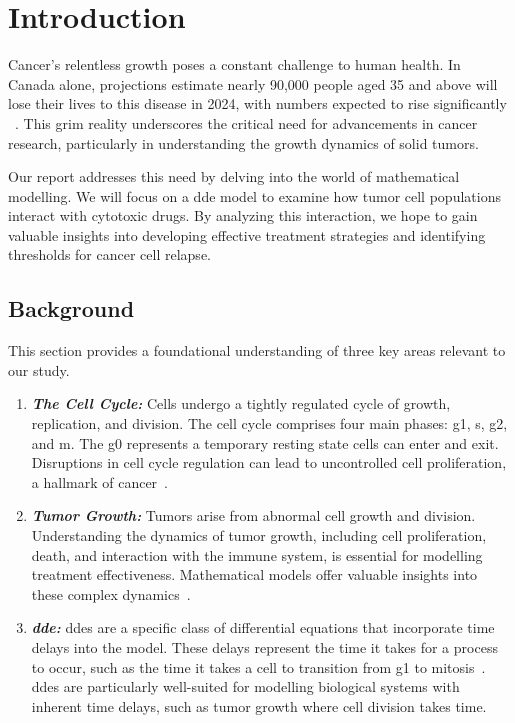 \chapter{Introduction}

Cancer's relentless growth poses a constant challenge to human health. In Canada alone, projections estimate nearly 90,000 people aged 35 and above will lose their lives to this disease in 2024, with numbers expected to rise significantly ~\cite{pader_estimates_2021}. This grim reality underscores the critical need for advancements in cancer research, particularly in understanding the growth dynamics of solid tumors.

Our report addresses this need by delving into the world of mathematical modelling.  We will focus on a \gls{dde} model to examine how tumor cell populations interact with \gls{cytotoxic} drugs.  By analyzing this interaction, we hope to gain valuable insights into developing effective treatment strategies and identifying thresholds for cancer cell \gls{relapse}.


\section{Background}

This section provides a foundational understanding of three key areas relevant to our study.

\begin{enumerate}
    \item \textbf{\textit{The Cell Cycle:}} Cells undergo a tightly regulated cycle of growth, replication, and division. The cell cycle comprises four main phases: \gls{g1}, \gls{s}, \gls{g2}, and \gls{m}. The \gls{g0} represents a temporary resting state cells can enter and exit. Disruptions in cell cycle regulation can lead to uncontrolled cell proliferation, a hallmark of cancer~\cite{alberts_molecular_2002}.
    \item \textbf{\textit{Tumor Growth:}} Tumors arise from abnormal cell growth and division. Understanding the dynamics of tumor growth, including cell proliferation, death, and interaction with the immune system, is essential for modelling treatment effectiveness. Mathematical models offer valuable insights into these complex dynamics~\cite{busenberg_differential_1981}.
    \item \textbf{\textit{\gls{dde}:}} \gls{dde}s are a specific class of differential equations that incorporate time delays into the model. These delays represent the time it takes for a process to occur, such as the time it takes a cell to transition from \gls{g1} to mitosis~\cite{niculescu_stability_2021}. \gls{dde}s are particularly well-suited for modelling biological systems with inherent time delays, such as tumor growth where cell division takes time.
\end{enumerate}

